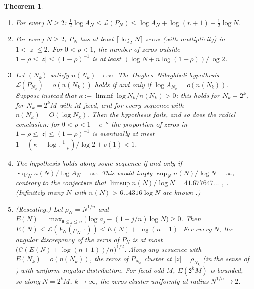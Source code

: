 \documentclass[11pt,a4paper]{article}
\newtheorem{theorem}{Theorem}[section]
\theoremstyle{definition}
\theoremstyle{remark}
\numberwithin{equation}{section}
\begin{document}
\begin{theorem}\label{B:C:thm-HN}
\leavevmode
\begin{enumerate}
\item For every $N\ge2$:
$\tfrac12\log A_N\le\mathcal L(P_N)\le\log A_N+\log(n+1)-\tfrac12\log N$.
\item For every $N\ge2$, $P_N$ has at least $\lceil\log_2N\rceil$ zeros (with
multiplicity) in $1<|z|\le2$.  For $0<\rho<1$, the number of zeros outside
$1-\rho\le|z|\le(1-\rho)^{-1}$ is at least $(\log N+n\log(1-\rho))/\log2$.
\item Let $(N_k)$ satisfy $n(N_k)\to\infty$.  The Hughes--Nikeghbali hypothesis
$\mathcal L(P_{N_k})=o(n(N_k))$ holds if and only if $\log A_{N_k}=o(n(N_k))$.
Suppose instead that $\kappa:=\liminf\log N_k/n(N_k)>0$; this holds for
$N_k=2^k$, for $N_k=2^kM$ with $M$ fixed, and for every sequence with
$n(N_k)=O(\log N_k)$.  Then the hypothesis fails, and so does the radial
conclusion: for $0<\rho<1-e^{-\kappa}$ the proportion of zeros in
$1-\rho\le|z|\le(1-\rho)^{-1}$ is eventually at most
$1-(\kappa-\log\frac1{1-\rho})/\log2+o(1)<1$.
\item The hypothesis holds along some sequence if and only if
$\sup_Nn(N)/\log A_N=\infty$.  This would imply $\sup_Nn(N)/\log N=\infty$,
contrary to the conjecture that $\limsup n(N)/\log N=41.677647\ldots$
\cite[Conj.~4.1]{R032}, \cite{R031}.  (Infinitely many $N$ with
$n(N)>6.14316\log N$ are known \cite{R033}.)
\item (Rescaling.)  Let $\rho_N=N^{1/n}$ and
$E(N)=\max_{0\le j\le n}\bigl(\log a_j-(1-j/n)\log N\bigr)\ge0$.  Then
$E(N)\le\mathcal L(P_N(\rho_N\,\cdot))\le E(N)+\log(n+1)$.  For every $N$, the
angular discrepancy of the zeros of $P_N$ is at most
$\bigl(C(E(N)+\log(n+1))/n\bigr)^{1/2}$.  Along any sequence with
$E(N_k)=o(n(N_k))$, the zeros of $P_{N_k}$ cluster at $|z|=\rho_{N_k}$ (in the
sense of \cite{R026}) with uniform angular distribution.  For fixed odd $M$,
$E(2^kM)$ is bounded, so along $N=2^kM$, $k\to\infty$, the zeros cluster
uniformly at radius $N^{1/n}\to2$.
\end{enumerate}
\end{theorem}
\end{document}

